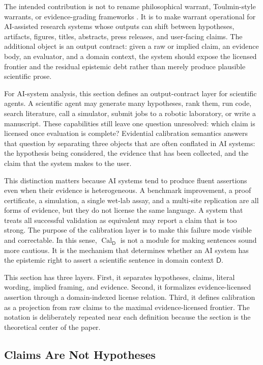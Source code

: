\documentclass[11pt,a4paper]{article}
\newcommand{\Cal}{\operatorname{Cal}}
\newcommand{\Dom}{\mathsf{D}}
\begin{document}
The intended contribution is not to rename philosophical warrant, Toulmin-style warrants, or evidence-grading frameworks \citep{Toulmin1958Uses,Guyatt2008GRADE}. It is to make warrant operational for AI-assisted research systems whose outputs can shift between hypotheses, artifacts, figures, titles, abstracts, press releases, and user-facing claims. The additional object is an output contract: given a raw or implied claim, an evidence body, an evaluator, and a domain context, the system should expose the licensed frontier and the residual epistemic debt rather than merely produce plausible scientific prose.

For AI-system analysis, this section defines an output-contract layer for scientific agents. A scientific agent may generate many hypotheses, rank them, run code, search literature, call a simulator, submit jobs to a robotic laboratory, or write a manuscript. These capabilities still leave one question unresolved: which claim is licensed once evaluation is complete? Evidential calibration semantics answers that question by separating three objects that are often conflated in AI systems: the hypothesis being considered, the evidence that has been collected, and the claim that the system makes to the user.

This distinction matters because AI systems tend to produce fluent assertions even when their evidence is heterogeneous. A benchmark improvement, a proof certificate, a simulation, a single wet-lab assay, and a multi-site replication are all forms of evidence, but they do not license the same language. A system that treats all successful validation as equivalent may report a claim that is too strong. The purpose of the calibration layer is to make this failure mode visible and correctable. In this sense, $\Cal_{\Dom}$ is not a module for making sentences sound more cautious. It is the mechanism that determines whether an AI system has the epistemic right to assert a scientific sentence in domain context $\Dom$.

This section has three layers. First, it separates hypotheses, claims, literal wording, implied framing, and evidence. Second, it formalizes evidence-licensed assertion through a domain-indexed license relation. Third, it defines calibration as a projection from raw claims to the maximal evidence-licensed frontier. The notation is deliberately repeated near each definition because the section is the theoretical center of the paper.

\subsection{Claims Are Not Hypotheses}
\end{document}
